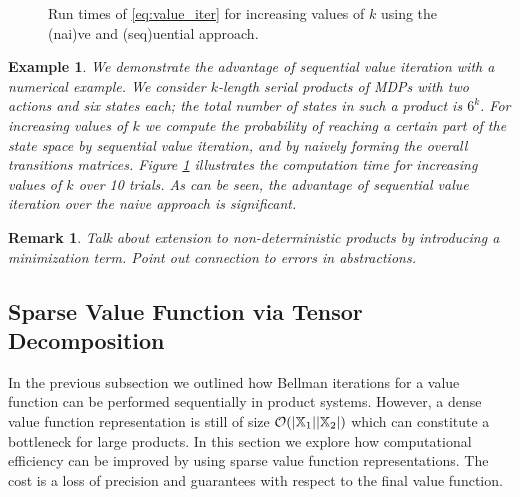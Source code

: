 \documentclass[conference]{IEEEtran}
\newlength\figureheight
\newlength\figurewidth
\newtheorem{remark}{Remark}
\newtheorem{example}{Example}
\newcommand{\red}[1]{{\color{red} #1 }}
\begin{document}
  \begin{figure}[h]
    \setlength{} 
    \setlength{} 
    \begin{center}
    
    \end{center}
    \caption{Run times of \eqref{eq:value_iter} for increasing values of $k$ using the (nai)ve and (seq)uential approach.}
    \label{fig:scalability}
  \end{figure}
\begin{example}
  We demonstrate the advantage of sequential value iteration with a numerical example. We consider $k$-length serial products of MDPs with two actions and six states each; the total number of states in such a product is $6^k$. For increasing values of $k$ we compute the probability of reaching a certain part of the state space by sequential value iteration, and by naively forming the overall transitions matrices. Figure \ref{fig:scalability} illustrates the computation time for increasing values of $k$ over 10 trials. As can be seen, the advantage of sequential value iteration over the naive approach is significant.
\end{example}

\begin{remark}
  \red{Talk about extension to non-deterministic products by introducing a minimization term. Point out connection to errors in abstractions.} 
\end{remark}

\subsection{Sparse Value Function via Tensor Decomposition}

In the previous subsection we outlined how Bellman iterations for a value function can be performed sequentially in product systems. However, a dense value function representation is still of size $\mathcal O (|\mathbb{X}_1| |\mathbb{X}_2|)$ which can constitute a bottleneck for large products. In this section we explore how computational efficiency can be improved by using sparse value function representations. The cost is a loss of precision and guarantees with respect to the final value function.
\end{document}
